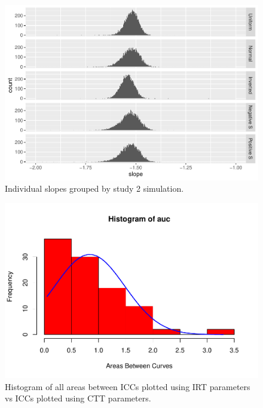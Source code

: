 \documentclass[
  jou]{apa6}
\begin{document}
\begin{figure}
\centering
\includegraphics{ICC_project_files/figure-latex/stackeplotSlope-1.pdf}
\caption{\label{fig:stackeplotSlope}Individual slopes grouped by study 2 simulation.}
\end{figure}

\begin{figure}
\centering
\includegraphics{ICC_project_files/figure-latex/histrogram-1.pdf}
\caption{\label{fig:histrogram}Histogram of all areas between ICCs plotted using IRT parameters vs ICCs plotted using CTT parameters.}
\end{figure}
\end{document}
